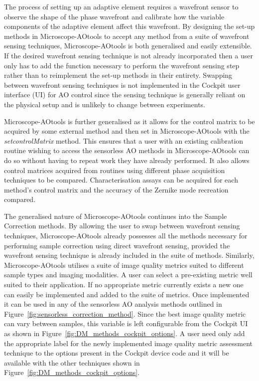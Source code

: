 The process of setting up an adaptive element requires a wavefront sensor 
to observe the shape of the phase wavefront and calibrate how the variable 
components of the adaptive element affect this wavefront. By designing the 
set-up methods in Microscope-AOtools to accept any method from a suite of 
wavefront sensing techniques, Microscope-AOtools is both generalised and 
easily extensible. If the desired wavefront sensing technique is not 
already incorporated then a user only has to add the function necessary to 
perform the wavefront sensing step rather than to reimplement the set-up 
methods in their entirety. Swapping between wavefront sensing techniques is 
not implemented in the Cockpit user interface (UI) for AO control since the 
sensing technique is generally reliant on the physical setup and is 
unlikely to change between experiments.

Microscope-AOtools is further generalised as it allows for the control 
matrix to be acquired by some external method and then set in 
Microscope-AOtools with the \textit{set\textunderscore controlMatrix} 
method. This ensures that a user with an existing calibration routine 
wishing to access the sensorless AO methods in Microscope-AOtools can do so 
without having to repeat work they have already performed. It also allows 
control matrices acquired from routines using different phase acquisition 
techniques to be compared. Characterisation assays can be acquired for each 
method's control matrix and the accuracy of the Zernike mode recreation 
compared.

The generalised nature of Microscope-AOtools continues into the Sample 
Correction methods. By allowing the user to swap between wavefront sensing 
techniques, Microscope-AOtools already possesses all the methods necessary 
for performing sample correction using direct wavefront sensing, provided 
the wavefront sensing technique is already included in the suite of 
methods. Similarly, Microscope-AOtools utilises a suite of image quality 
metrics suited to different sample types and imaging modalities. A user can 
select a pre-existing metric well suited to their application. If no 
appropriate metric currently exists a new one can easily be implemented 
and added  to the suite of metrics. Once implemented it can be used in any 
of the sensorless AO analysis methods outlined in 
Figure~\ref{fig:sensorless_correction_method}. Since the best image quality 
metric can vary between samples, this variable is left configurable from 
the Cockpit UI as shown in Figure~\ref{fig:DM_methods_cockpit_options}. A 
user need only add the appropriate label for the newly implemented image 
quality metric assessment technique to the options present in the Cockpit 
device code and it will be available with the other techniques shown in 
Figure~\ref{fig:DM_methods_cockpit_options}.

